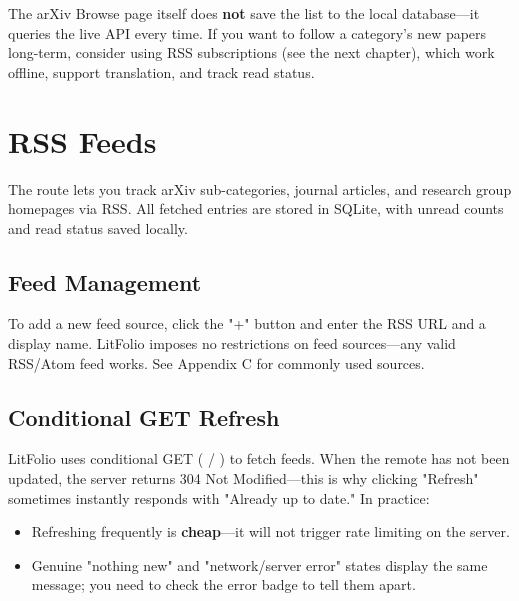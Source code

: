 \begin{tipbox}
The arXiv Browse page itself does \textbf{not} save the list to the local database---it queries
the live API every time. If you want to follow a category's new papers long-term, consider using
RSS subscriptions (see the next chapter), which work offline, support translation, and track read
status.
\end{tipbox}

\chapter{RSS Feeds}
\label{ch:feeds}

The  route lets you track arXiv sub-categories, journal articles, and research group
homepages via RSS. All fetched entries are stored in SQLite, with unread counts and read status
saved locally.

\section{Feed Management}


To add a new feed source, click the "+" button and enter the RSS URL and a display name. LitFolio
imposes no restrictions on feed sources---any valid RSS/Atom feed works. See Appendix C for
commonly used sources.

\section{Conditional GET Refresh}

LitFolio uses conditional GET ( / ) to fetch feeds. When the
remote has not been updated, the server returns 304 Not Modified---this is why clicking "Refresh"
sometimes instantly responds with "Already up to date." In practice:

\begin{itemize}
  \item Refreshing frequently is \textbf{cheap}---it will not trigger rate limiting on the server.
  \item Genuine "nothing new" and "network/server error" states display the same message; you need
    to check the error badge to tell them apart.
\end{itemize}

